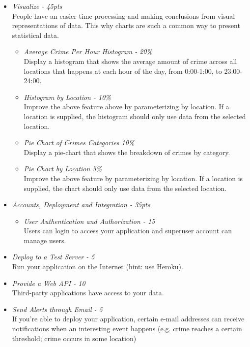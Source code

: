 \documentclass[12pt]{article}
\begin{document}
\begin{itemize}
\item \textit{Visualize - 45pts} \\
People have an easier time processing and making conclusions from visual representations of data. This why charts are such a common way to present statistical data.
\begin{itemize}
\item \textit{Average Crime Per Hour Histogram - 20\%} \\
Display a histogram that shows the average amount of crime across all locations that happens at each hour of the day, from 0:00-1:00, to 23:00-24:00.
\item \textit{Histogram by Location - 10\%} \\
Improve the above feature above by parameterizing by location. If a location is supplied, the histogram should only use data from the selected location.
\item \textit{Pie Chart of Crimes Categories 10\%} \\
Display a pie-chart that shows the breakdown of crimes by category.
\item \textit{Pie Chart by Location 5\%} \\
Improve the above feature by parameterizing by location. If a location is supplied, the chart should only use data from the selected location.
\end{itemize}

\item \textit{Accounts, Deployment and Integration - 35pts} \\
\begin{itemize}
\item \textit{User Authentication and Authorization - 15} \\
Users can login to access your application and superuser account can manage users.
\end{itemize}
\item \textit{Deploy to a Test Server - 5} \\
Run your application on the Internet (hint: use Heroku).
\item \textit{Provide a Web API - 10} \\
Third-party applications have access to your data.
\item \textit{Send Alerts through Email - 5} \\
If you're able to deploy your application, certain e-mail addresses can receive notifications when an interesting event happens (e.g. crime reaches a certain threshold; crime occurs in some location)

\end{itemize}
\end{document}
